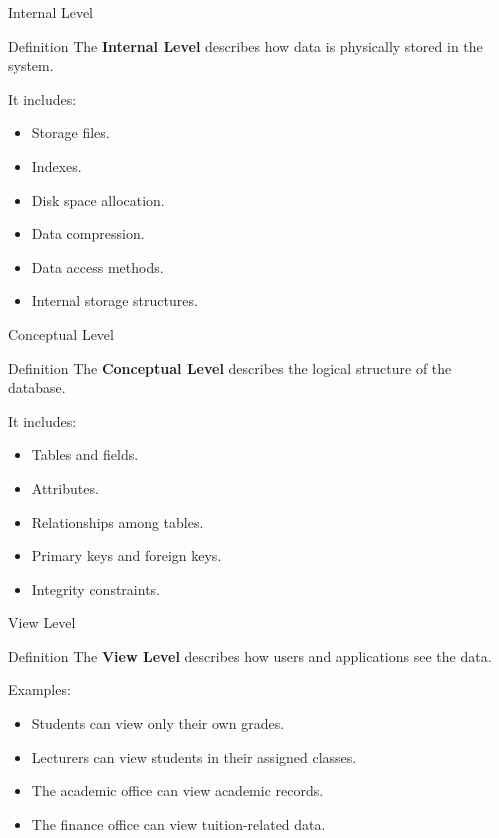 \documentclass[aspectratio=169,11pt]{beamer}
\begin{document}
\begin{frame}{Internal Level}
\begin{block}{Definition}
The \textbf{Internal Level} describes how data is physically stored in the system.
\end{block}

It includes:
\begin{itemize}
  \item Storage files.
  \item Indexes.
  \item Disk space allocation.
  \item Data compression.
  \item Data access methods.
  \item Internal storage structures.
\end{itemize}
\end{frame}

\begin{frame}{Conceptual Level}
\begin{block}{Definition}
The \textbf{Conceptual Level} describes the logical structure of the database.
\end{block}

It includes:
\begin{itemize}
  \item Tables and fields.
  \item Attributes.
  \item Relationships among tables.
  \item Primary keys and foreign keys.
  \item Integrity constraints.
\end{itemize}
\end{frame}

\begin{frame}{View Level}
\begin{block}{Definition}
The \textbf{View Level} describes how users and applications see the data.
\end{block}

Examples:
\begin{itemize}
  \item Students can view only their own grades.
  \item Lecturers can view students in their assigned classes.
  \item The academic office can view academic records.
  \item The finance office can view tuition-related data.
\end{itemize}
\end{frame}
\end{document}
